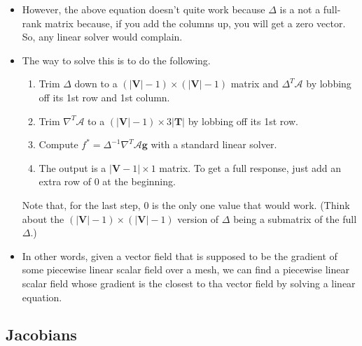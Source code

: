\documentclass[10pt]{article}
\newcommand{\ve}[1]{\mathbf{#1}}
\newcommand{\mcal}[1]{\mathcal{#1}}
\begin{document}
\begin{itemize}
    \item However, the above equation doesn't quite work because $\Delta$ is a not a full-rank matrix because, if you add the columns up, you will get a zero vector. So, any linear solver would complain.
    
    \item The way to solve this is to do the following.
    \begin{enumerate}
        \item Trim $\Delta$ down to a $(|\ve{V}|-1) \times (|\ve{V}|-1)$ matrix and $\Delta^T \mcal{A}$ by lobbing off its 1st row and 1st column.
        \item Trim $\nabla^T \mcal{A}$ to a $(|\ve{V}|-1) \times 3|\ve{T}|$ by lobbing off its 1st row.
        \item Compute $f^* = \Delta^{-1} \nabla^T \mcal{A}\ve{g}$ with a standard linear solver.
        \item The output is a $|\ve{V}-1| \times 1$ matrix. To get a full response, just add an extra row of $0$ at the beginning.
    \end{enumerate}
    Note that, for the last step, $0$ is the only one value that would work. (Think about the $(|\ve{V}|-1) \times (|\ve{V}|-1)$ version of $\Delta$ being a submatrix of the full $\Delta$.)

    \item In other words, given a vector field that is supposed to be the gradient of some piecewise linear scalar field over a mesh, we can find a piecewise linear scalar field whose gradient is the closest to tha vector field by solving a linear equation.
\end{itemize}

\subsection{Jacobians}
    
\end{document}
